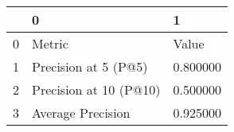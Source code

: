 \begin{tabular}{lll}
\toprule
 & 0 & 1 \\
\midrule
0 & Metric & Value \\
1 & Precision at 5 (P@5) & 0.800000 \\
2 & Precision at 10 (P@10) & 0.500000 \\
3 & Average Precision & 0.925000 \\
\bottomrule
\end{tabular}
